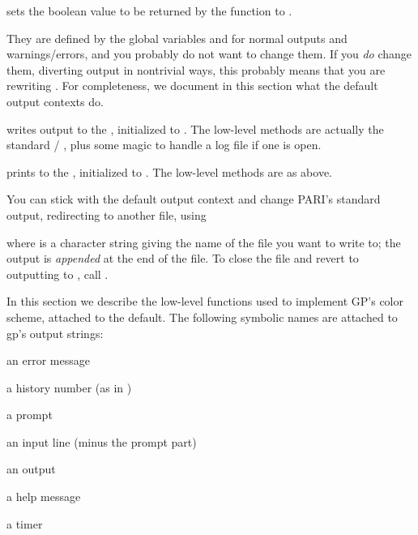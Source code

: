  sets the boolean value
to be returned by the function  to .

 They are defined by the global variables
 and  for normal outputs and warnings/errors, and you
probably do not want to change them. If you \emph{do} change them, diverting
output in nontrivial ways, this probably means that you are rewriting
. For completeness, we document in this section what the default
output contexts do.

 writes output to the  ,
initialized to .  The low-level methods are actually the standard
 / , plus some magic to handle a log file if one is
open.

 prints to the  , initialized
to . The low-level methods are as above.

You can stick with the default  output context and change PARI's
standard output, redirecting  to another file, using

 where  is a character string
giving the name of the file you want to write to; the output is
\emph{appended} at the end of the file. To close the file and revert to
outputting to , call .

In this section we describe the low-level functions used to implement GP's
color scheme, attached to the  default. The following symbolic
names are attached to gp's output strings:

\item {} an error message

\item {} a history number (as in )

\item {} a prompt

\item {} an input line (minus the prompt part)

\item {} an output

\item {} a help message

\item {} a timer


